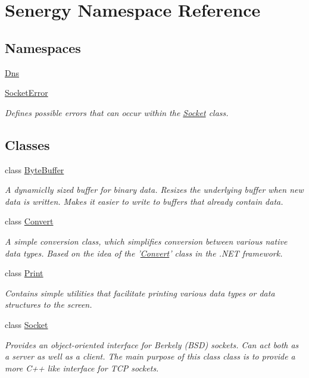 \hypertarget{namespace_senergy}{\section{Senergy Namespace Reference}
\label{namespace_senergy}
}
\subsection*{Namespaces}
\begin{DoxyCompactItemize}
\item 
\hyperlink{namespace_senergy_1_1_dns}{Dns}
\item 
\hyperlink{namespace_senergy_1_1_socket_error}{Socket\-Error}
\begin{DoxyCompactList}\small\item\em Defines possible errors that can occur within the \hyperlink{class_senergy_1_1_socket}{Socket} class. \end{DoxyCompactList}\end{DoxyCompactItemize}
\subsection*{Classes}
\begin{DoxyCompactItemize}
\item 
class \hyperlink{class_senergy_1_1_byte_buffer}{Byte\-Buffer}
\begin{DoxyCompactList}\small\item\em A dynamiclly sized buffer for binary data. Resizes the underlying buffer when new data is written. Makes it easier to write to buffers that already contain data. \end{DoxyCompactList}\item 
class \hyperlink{class_senergy_1_1_convert}{Convert}
\begin{DoxyCompactList}\small\item\em A simple conversion class, which simplifies conversion between various native data types. Based on the idea of the '\hyperlink{class_senergy_1_1_convert}{Convert}' class in the .N\-E\-T framework. \end{DoxyCompactList}\item 
class \hyperlink{class_senergy_1_1_print}{Print}
\begin{DoxyCompactList}\small\item\em Contains simple utilities that facilitate printing various data types or data structures to the screen. \end{DoxyCompactList}\item 
class \hyperlink{class_senergy_1_1_socket}{Socket}
\begin{DoxyCompactList}\small\item\em Provides an object-\/oriented interface for Berkely (B\-S\-D) sockets. Can act both as a server as well as a client. The main purpose of this class class is to provide a more C++ like interface for T\-C\-P sockets. \end{DoxyCompactList}\end{DoxyCompactItemize}
